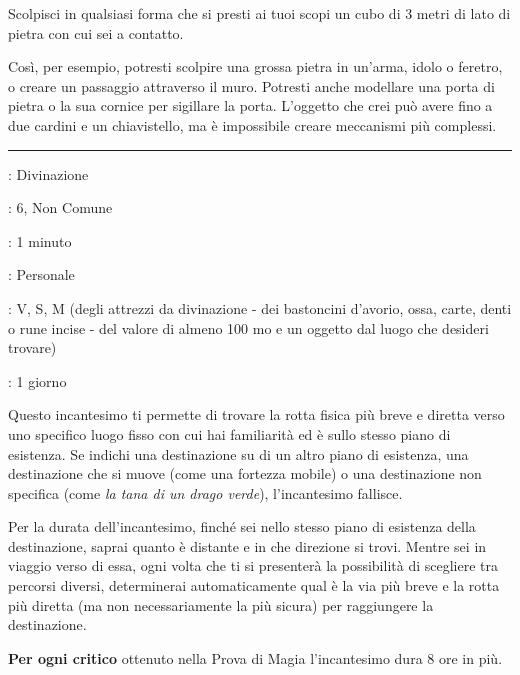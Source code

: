 \begin{multicols}{2}
Scolpisci in qualsiasi forma che si presti ai tuoi scopi un cubo di 3 metri di lato di pietra con cui sei a contatto.

Così, per esempio, potresti scolpire una grossa pietra in un'arma, idolo o feretro, o creare un passaggio attraverso il muro. Potresti anche modellare una porta di pietra o la sua cornice per sigillare la porta. L'oggetto che crei può avere fino a due cardini e un chiavistello, ma è impossibile creare meccanismi più complessi.

\smallskip\noindent\rule{\linewidth}{2pt} \hypertarget{Scopri il Percorso}{}\medskip{}
\noindent
\begin{description}[noitemsep, topsep=0pt, parsep=0pt, partopsep=0pt, leftmargin=0cm, labelwidth=2.8cm]
	\item[\textbf{Lista di Magia}]: Divinazione
	\item[\textbf{Livello}]: 6, Non Comune
	\item[\textbf{T. di Lancio}]: 1 minuto
	\item[\textbf{Gittata}]: Personale
	\item[\textbf{Componenti}]: V, S, M (degli attrezzi da divinazione - dei bastoncini d'avorio, ossa, carte, denti o rune incise - del valore di almeno 100 mo e un oggetto dal luogo che desideri trovare)
	\item[\textbf{Durata}]: 1 giorno
\end{description}

Questo incantesimo ti permette di trovare la rotta fisica più breve e diretta verso uno specifico luogo fisso con cui hai familiarità ed è sullo stesso piano di esistenza. Se indichi una destinazione su di un altro piano di esistenza, una destinazione che si muove (come una fortezza mobile) o una destinazione non specifica (come \emph{la tana di un drago verde}), l'incantesimo fallisce.

Per la durata dell'incantesimo, finché sei nello stesso piano di esistenza della destinazione, saprai quanto è distante e in che direzione si trovi. Mentre sei in viaggio verso di essa, ogni volta che ti si presenterà la possibilità di scegliere tra percorsi diversi, determinerai automaticamente qual è la via più breve e la rotta più diretta (ma non necessariamente la più sicura) per raggiungere la destinazione.

\textbf{Per ogni critico} ottenuto nella Prova di Magia l'incantesimo dura 8 ore in più.


\end{multicols}
